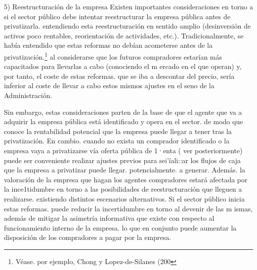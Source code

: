 \documentclass[10pt,a4paper]{article}
\begin{document}
5) Reestructuración de la empresa
Existen importantes consideraciones en torno a si el sector público debe intentar reestructurar la empresa pública antes de privatizarla. entendiendo esta reestructuración en sentido amplio (desinversión de activos poco rentables, reorientación de actividades, etc.). Tradicionalmente, se había entendido que estas reformas no debían acometerse antes de la privatización.\footnote{Véase. por ejemplo, Chong y Lopez-de-Silanes (200
} al considerarse que los futuros compradores estarían más capacitados para llevarlas a cabo (conociendo el m ercado en el que operan) y, por tanto, el coste de estas reformas. que se iba a descontar del precio, sería inferior al coste de llevar a cabo estos mismos ajustes en el seno de la Administración.

Sin embargo, estas consideraciones parten de la base de que el agente que va a adquirir la empresa pública está identificado y opera en el sector. de modo que conoce la rentabilidad potencial que la empresa puede llegar a tener tras la privatización. En cambio. cuando no exista un comprador identificado o la empresa vaya a privatizarse vía oferta pública de 1·enta ( ver posteriormente) puede ser conveniente realizar ajustes previos para sei'íali::ar los flujos de caja que la empresa a privatizar puede llegar. potencialmente. a generar. Además. la valoración de la empresa que hagan los agentes compradores estará afectada por la ince1tidumbre en torno a las posibilidades de reestructuración que lleguen a realizarse. existiendo distintos escenarios alternativos. Si el sector público inicia estas reformas. puede reducir la incertidumbre en torno al devenir de las m ismas, además de mitigar la asimetría informativa que existe con respecto al funcionamiento interno de la empresa. lo que en conjunto puede aumentar la disposición de los compradores a pagar por la empresa.
\end{document}
